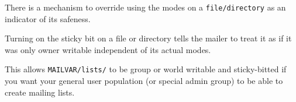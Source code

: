 There is a mechanism to override using the modes on a {\tt file/directory}
as an indicator of its safeness.

Turning on the sticky bit on a file or directory tells the mailer to treat
it as if it was only owner writable independent of its actual modes.

This allows {\tt MAILVAR/lists/} to be group or world writable and
sticky-bitted if you want your general user population (or special admin
group) to be able to create mailing lists.

